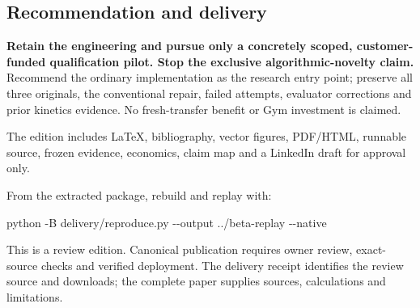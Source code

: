 \documentclass[
  10pt,
]{article}
\newenvironment{Shaded}{}{}
\newcommand{\AttributeTok}[1]{\textcolor[rgb]{0.49,0.56,0.16}{#1}}
\newcommand{\ExtensionTok}[1]{#1}
\newcommand{\NormalTok}[1]{#1}
\begin{document}
\hypertarget{recommendation-and-delivery}{%
\subsection{Recommendation and
delivery}\label{recommendation-and-delivery}}

\textbf{Retain the engineering and pursue only a concretely scoped,
customer-funded qualification pilot. Stop the exclusive
algorithmic-novelty claim.} Recommend the ordinary implementation as the
research entry point; preserve all three originals, the conventional
repair, failed attempts, evaluator corrections and prior kinetics
evidence. No fresh-transfer benefit or Gym investment is claimed.

The edition includes LaTeX, bibliography, vector figures, PDF/HTML,
runnable source, frozen evidence, economics, claim map and a LinkedIn
draft for approval only.

From the extracted package, rebuild and replay with:

\begin{Shaded}
\begin{Highlighting}[]
\ExtensionTok{python} \AttributeTok{{-}B}\NormalTok{ delivery/reproduce.py }\AttributeTok{{-}{-}output}\NormalTok{ ../beta{-}replay }\AttributeTok{{-}{-}native}
\end{Highlighting}
\end{Shaded}

This is a review edition. Canonical publication requires owner review,
exact-source checks and verified deployment. The delivery receipt
identifies the review source and downloads; the complete paper supplies
sources, calculations and limitations.
\end{document}

